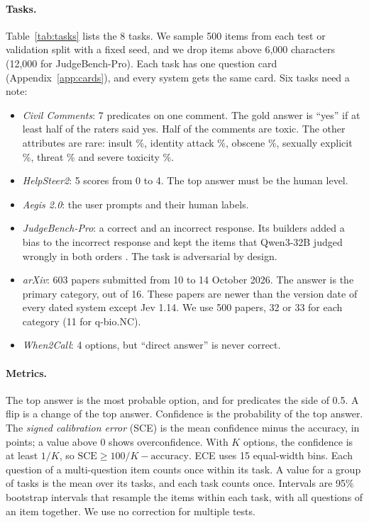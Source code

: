 \documentclass[11pt]{article}
\begin{document}
\paragraph{Tasks.}
Table~\ref{tab:tasks} lists the 8 tasks. We sample 500 items from each test or validation split with a fixed seed, and we drop items above 6,000 characters (12,000 for JudgeBench-Pro). Each task has one question card (Appendix~\ref{app:cards}), and every system gets the same card. Six tasks need a note:
\begin{itemize}
\setlength\itemsep{0pt}
\item \emph{Civil Comments}: 7 predicates on one comment. The gold answer is ``yes'' if at least half of the raters said yes. Half of the comments are toxic. The other attributes are rare: insult \posInsult\%, identity attack \posIdentityAttack\%, obscene \posObscene\%, sexually explicit \posSexualExplicit\%, threat \posThreat\% and severe toxicity \posSevereToxicity\%.
\item \emph{HelpSteer2}: 5 scores from 0 to 4. The top answer must be the human level.
\item \emph{Aegis 2.0}: the user prompts and their human labels.
\item \emph{JudgeBench-Pro}: a correct and an incorrect response. Its builders added a bias to the incorrect response and kept the items that Qwen3-32B judged wrongly in both orders \citep{lai2026biasscope}. The task is adversarial by design.
\item \emph{arXiv}: 603 papers submitted from 10 to 14 October 2026. The answer is the primary category, out of 16. These papers are newer than the version date of every dated system except Jev 1.14. We use 500 papers, 32 or 33 for each category (11 for q-bio.NC).
\item \emph{When2Call}: 4 options, but ``direct answer'' is never correct.
\end{itemize}

\paragraph{Metrics.}
The top answer is the most probable option, and for predicates the side of 0.5. A flip is a change of the top answer. Confidence is the probability of the top answer. The \emph{signed calibration error} (SCE) is the mean confidence minus the accuracy, in points; a value above 0 shows overconfidence. With $K$ options, the confidence is at least $1/K$, so $\text{SCE} \geq 100/K - \text{accuracy}$. ECE uses 15 equal-width bins. Each question of a multi-question item counts once within its task. A value for a group of tasks is the mean over its tasks, and each task counts once. Intervals are 95\% bootstrap intervals that resample the items within each task, with all questions of an item together. We use no correction for multiple tests.
\end{document}
